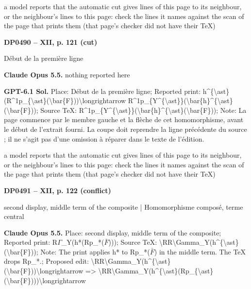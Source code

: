 a model reports that the automatic cut gives lines of this page to its neighbour, or the neighbour's lines to this page: check the lines it names against the scan of the page that prints them (that page's checker did not have their TeX)\par
\par\noindent\hypertarget{DP0490}{}\textbf{DP0490 -- XII, p. 121 (cut)}\par
Début de la première ligne\par
\textbf{Claude Opus 5.5.} nothing reported here\par
\textbf{GPT-6.1 Sol.} Place: Début de la première ligne; Reported print: h\textasciicircum{}\{\textbackslash{}ast\}(R\textasciicircum{}1p\_\{\textbackslash{}ast\}(\textbackslash{}bar\{F\}))\textbackslash{}longrightarrow R\textasciicircum{}1p\_\{Y\textasciicircum{}\{\textbackslash{}ast\}\}(\textbackslash{}bar\{h\}\textasciicircum{}\{\textbackslash{}ast\}(\textbackslash{}bar\{F\})); Source TeX: R\textasciicircum{}1p\_\{Y\textasciicircum{}\{\textbackslash{}ast\}\}(\textbackslash{}bar\{h\}\textasciicircum{}\{\textbackslash{}ast\}(\textbackslash{}bar\{F\})); Note: La page commence par le membre gauche et la flèche de cet homomorphisme, avant le début de l'extrait fourni. La coupe doit reprendre la ligne précédente du source ; il ne s'agit pas d'une omission à réparer dans le texte de l'édition.\par
a model reports that the automatic cut gives lines of this page to its neighbour, or the neighbour's lines to this page: check the lines it names against the scan of the page that prints them (that page's checker did not have their TeX)\par
\par\noindent\hypertarget{DP0491}{}\textbf{DP0491 -- XII, p. 122 (conflict)}\par
second display, middle term of the composite | Homomorphisme composé, terme central\par
\textbf{Claude Opus 5.5.} Place: second display, middle term of the composite; Reported print: R\ensuremath{\Gamma}\_Y(h*(Rp\_*(\ensuremath{\bar{F}}))); Source TeX: \textbackslash{}RR\textbackslash{}Gamma\_Y(h\textasciicircum{}\{\textbackslash{}ast\}(\textbackslash{}bar\{F\})); Note: The print applies h* to Rp\_*(\ensuremath{\bar{F}}) in the middle term. The TeX drops Rp\_*.; Proposed edit: \textbackslash{}RR\textbackslash{}Gamma\_Y(h\textasciicircum{}\{\textbackslash{}ast\}(\textbackslash{}bar\{F\}))\textbackslash{}longrightarrow =\allowbreak > \textbackslash{}RR\textbackslash{}Gamma\_Y(h\textasciicircum{}\{\textbackslash{}ast\}(Rp\_\{\textbackslash{}ast\}(\textbackslash{}bar\{F\})))\textbackslash{}longrightarrow\par

